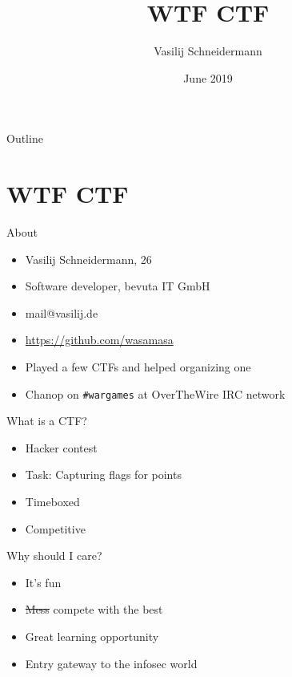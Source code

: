 \documentclass[presentation]{beamer}
\author{Vasilij Schneidermann}
\date{June 2019}
\title{WTF CTF}
\begin{document}
\maketitle
\begin{frame}{Outline}
\tableofcontents
\end{frame}

\AtBeginSection{\frame{\sectionpage}}

\section{WTF CTF}
\label{sec:org35fdd3b}

\begin{frame}[fragile,label={sec:org6819f97}]{About}
 \begin{itemize}
\item Vasilij Schneidermann, 26
\item Software developer, bevuta IT GmbH
\item mail@vasilij.de
\item \url{https://github.com/wasamasa}
\item Played a few CTFs and helped organizing one
\item Chanop on \texttt{\#wargames} at OverTheWire IRC network
\end{itemize}
\end{frame}

\begin{frame}[label={sec:orgc40206c}]{What is a CTF?}
\begin{itemize}
\item Hacker contest
\item Task: Capturing flags for points
\item Timeboxed
\item Competitive
\end{itemize}
\end{frame}

\begin{frame}[label={sec:org835f98a}]{Why should I care?}
\begin{itemize}
\item It's fun
\item \sout{Mess} compete with the best
\item Great learning opportunity
\item Entry gateway to the infosec world
\end{itemize}
\end{frame}
\end{document}
